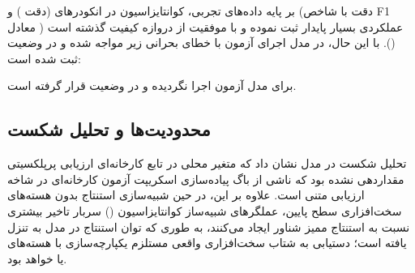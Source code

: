 بر پایه داده‌های تجربی، کوانتایزاسیون  در انکودرهای  (دقت ) و  (دقت  با شاخص F1 معادل ) عملکردی بسیار پایدار ثبت نموده و با موفقیت از دروازه کیفیت گذشته است (). با این حال، در مدل  اجرای آزمون با خطای بحرانی زیر مواجه شده و در وضعیت  ثبت شده است:
\begin{center}
\small
{}
\end{center}
برای مدل  آزمون اجرا نگردیده و در وضعیت  قرار گرفته است.

\subsection{محدودیت‌ها و تحلیل شکست}
تحلیل شکست در مدل  نشان داد که متغیر محلی در تابع کارخانه‌ای ارزیابی پرپلکسیتی مقداردهی نشده بود که ناشی از باگ پیاده‌سازی اسکریپت آزمون کارخانه‌ای در شاخه ارزیابی متنی است. علاوه بر این، در حین شبیه‌سازی استنتاج بدون هسته‌های سخت‌افزاری سطح پایین، عملگرهای شبیه‌ساز کوانتایزاسیون () سربار تاخیر بیشتری نسبت به استنتاج ممیز شناور ایجاد می‌کنند، به طوری که توان استنتاج در مدل  به  تنزل یافته است؛ دستیابی به شتاب سخت‌افزاری واقعی مستلزم یکپارچه‌سازی با هسته‌های  یا  خواهد بود.
